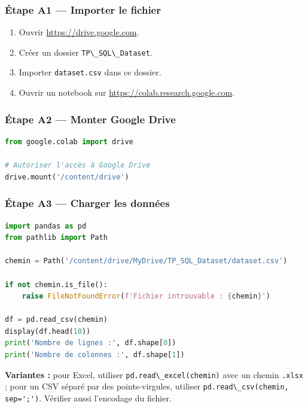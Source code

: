 \documentclass[
]{article}
\newcommand{\passthrough}[1]{#1}
\providecommand{\tightlist}{%
  \setlength{\itemsep}{0pt}\setlength{\parskip}{0pt}}
\begin{document}
\subsubsection{Étape A1 --- Importer le
fichier}\label{uxe9tape-a1-importer-le-fichier}

\begin{enumerate}
\def\labelenumi{\arabic{enumi}.}
\tightlist
\item
  Ouvrir \url{https://drive.google.com}.
\item
  Créer un dossier \passthrough{\lstinline!TP\_SQL\_Dataset!}.
\item
  Importer \passthrough{\lstinline!dataset.csv!} dans ce dossier.
\item
  Ouvrir un notebook sur \url{https://colab.research.google.com}.
\end{enumerate}

\subsubsection{Étape A2 --- Monter Google
Drive}\label{uxe9tape-a2-monter-google-drive}

\begin{lstlisting}[language=Python]
from google.colab import drive

# Autoriser l'accès à Google Drive
drive.mount('/content/drive')
\end{lstlisting}

\subsubsection{Étape A3 --- Charger les
données}\label{uxe9tape-a3-charger-les-donnuxe9es}

\begin{lstlisting}[language=Python]
import pandas as pd
from pathlib import Path

chemin = Path('/content/drive/MyDrive/TP_SQL_Dataset/dataset.csv')

if not chemin.is_file():
    raise FileNotFoundError(f'Fichier introuvable : {chemin}')

df = pd.read_csv(chemin)
display(df.head(10))
print('Nombre de lignes :', df.shape[0])
print('Nombre de colonnes :', df.shape[1])
\end{lstlisting}

\textbf{Variantes :} pour Excel, utiliser
\passthrough{\lstinline!pd.read\_excel(chemin)!} avec un chemin
\passthrough{\lstinline!.xlsx!} ; pour un CSV séparé par des
points-virgules, utiliser
\passthrough{\lstinline!pd.read\_csv(chemin, sep=';')!}. Vérifier aussi
l'encodage du fichier.
\end{document}

